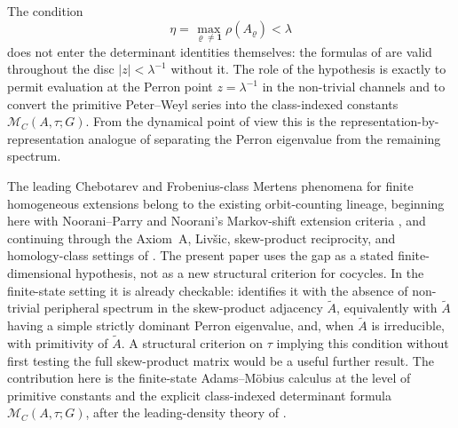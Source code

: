 \begin{remark}
  \label{rem:twisted-spectral-gap-role}
  The condition
  \[
    \eta=\max_{\varrho\neq\mathbf 1}\rho(A_\varrho)<\lambda
  \]
  does not enter the determinant identities themselves: the formulas of
  are valid throughout the disc \(|z|<\lambda^{-1}\) without it. The
  role of the hypothesis is exactly to permit evaluation at the Perron
  point \(z=\lambda^{-1}\) in the non-trivial channels and to convert the
  primitive Peter--Weyl series into the class-indexed constants
  \(\mathcal M_C(A,\tau;G)\). From the dynamical point of view this is the
  representation-by-representation analogue of separating the Perron
  eigenvalue from the remaining spectrum.

  The leading Chebotarev and Frobenius-class Mertens phenomena for finite
  homogeneous extensions belong to the existing orbit-counting lineage,
  beginning here with Noorani--Parry
  \cite{NooraniParry1992ChebotarevShifts} and Noorani's Markov-shift
  extension criteria \cite{Noorani1997HomogeneousExtensionsMarkov}, and
  continuing through the Axiom~A, Liv\v{s}ic, skew-product reciprocity, and
  homology-class settings of
  \cite{ParryPollicott1986Chebotarev,Parry1999LivsicNonAbelian,ParryPollicott1997LivsicCompactLie,ParryPollicott2008BauerSkewProducts,PollicottSharp2008ArtinReciprocitySkewProducts,KatsudaSunada1990ClosedOrbitsHomology,Sharp1993ClosedOrbitsHomologyAnosov,PollicottSharp2007Chebotarev,BoyleSchmieding2017FiniteGroupExtensions}.
  The present paper uses the gap as a stated finite-dimensional hypothesis,
  not as a new structural criterion for cocycles.  In the finite-state setting
  it is already checkable:
   identifies it with the
  absence of non-trivial peripheral spectrum in the skew-product
  adjacency \(\widetilde A\), equivalently with \(\widetilde A\) having
  a simple strictly dominant Perron eigenvalue, and, when
  \(\widetilde A\) is irreducible, with primitivity of
  \(\widetilde A\). A structural criterion on \(\tau\) implying this condition
  without first testing the full skew-product matrix would be a useful further
  result.  The contribution here is the finite-state Adams--M\"obius calculus at
  the level of primitive constants and the explicit class-indexed determinant
  formula \(\mathcal M_C(A,\tau;G)\), after the leading-density theory of
  \cite{Lalley1987DistributionPeriodicOrbits,Coles2025VassilievWritheAxiomA}.
\end{remark}
